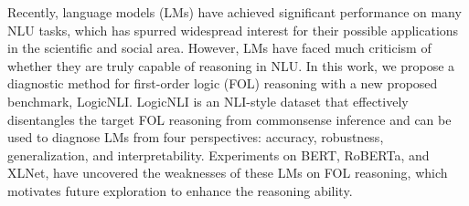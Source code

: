 Recently, language models (LMs) have achieved significant performance on many NLU tasks, which has spurred widespread interest for their possible applications in the scientific and social area. However, LMs have faced much criticism of whether they are truly capable of reasoning in NLU. In this work, we propose a diagnostic method for first-order logic (FOL) reasoning with a new proposed benchmark, LogicNLI. LogicNLI is an NLI-style dataset that effectively disentangles the target FOL reasoning from commonsense inference and can be used to diagnose LMs from four perspectives: accuracy, robustness, generalization, and interpretability. Experiments on BERT, RoBERTa, and XLNet, have uncovered the weaknesses of these LMs on FOL reasoning, which motivates future exploration to enhance the reasoning ability.

